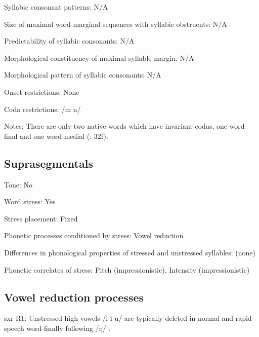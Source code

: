 {\begin{appendixdesc}
\item[Syllabic consonant patterns:] N/A

\item[Size of maximal word-marginal sequences with syllabic obstruents:] N/A

\item[Predictability of syllabic consonants:] N/A

\item[Morphological constituency of maximal syllable margin:] N/A

\item[Morphological pattern of syllabic consonants:] N/A

\item[Onset restrictions:] None

\item[Coda restrictions:] /m n/

\item[Notes:] There are only two native words which have invariant codas, one word-final and one word-medial (\citealt{Pan2012}: 32f).
\end{appendixdesc}
\subsection*{Suprasegmentals}
\begin{appendixdesc}
\item[Tone:] No

\item[Word stress:] Yes

\item[Stress placement:] Fixed

\item[Phonetic processes conditioned by stress:] Vowel reduction

\item[Differences in phonological properties of stressed and unstressed syllables:] (none)

\item[Phonetic correlates of stress:] Pitch (impressionistic), Intensity (impressionistic)
\end{appendixdesc}
\subsection*{Vowel reduction processes}
\begin{appendixdesc}

\item[sxr-R1:] Unstressed high vowels /i ɨ u/ are typically deleted in normal and rapid speech word-finally following /ŋ/ \citep[38]{Pan2012}.


\end{appendixdesc}}
